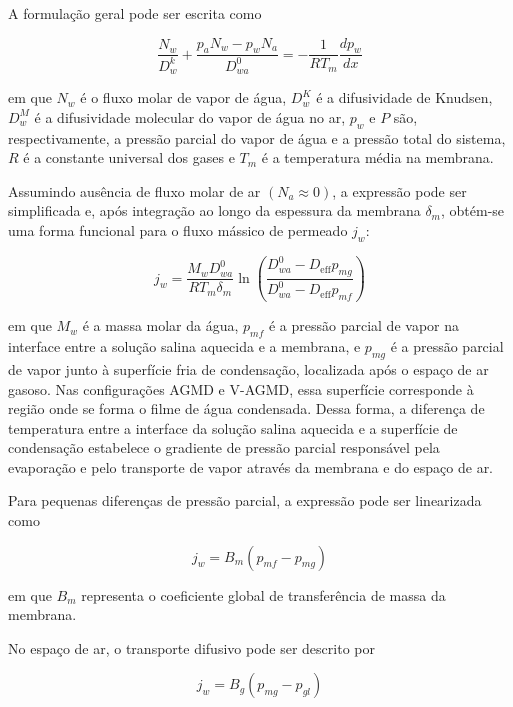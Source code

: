 A formulação geral pode ser escrita como

\begin{equation}
\frac{N_w}{D_w^k} + \frac{p_a N_w - p_w N_a}{D_{wa}^0}
=
-\frac{1}{R T_m}\frac{d p_w}{dx}
\end{equation}

\noindent em que \(N_w\) é o fluxo molar de vapor de água, \(D_w^{K}\) é a difusividade de Knudsen, \(D_w^{M}\) é a difusividade molecular do vapor de água no ar, \(p_w\) e \(P\) são, respectivamente, a pressão parcial do vapor de água e a pressão total do sistema, \(R\) é a constante universal dos gases e \(T_m\) é a temperatura média na membrana.

Assumindo ausência de fluxo molar de ar \((N_a \approx 0)\), a expressão pode ser simplificada e, após integração ao longo da espessura da membrana \(\delta_m\), obtém-se uma forma funcional para o fluxo mássico de permeado \(j_w\):

\begin{equation}
j_w = \frac{M_w D_{wa}^{0}}{R T_m \delta_m}
\ln \left(
\frac{D_{wa}^{0} - D_{\mathrm{eff}} p_{mg}}
{D_{wa}^{0} - D_{\mathrm{eff}} p_{mf}}
\right)
\end{equation}

\noindent em que \(M_w\) é a massa molar da água, \(p_{mf}\) é a pressão parcial de vapor na interface entre a solução salina aquecida e a membrana, e \(p_{mg}\) é a pressão parcial de vapor junto à superfície fria de condensação, localizada após o espaço de ar gasoso. Nas configurações AGMD e V-AGMD, essa superfície corresponde à região onde se forma o filme de água condensada. Dessa forma, a diferença de temperatura entre a interface da solução salina aquecida e a superfície de condensação estabelece o gradiente de pressão parcial responsável pela evaporação e pelo transporte de vapor através da membrana e do espaço de ar.

Para pequenas diferenças de pressão parcial, a expressão pode ser linearizada como

\begin{equation}
j_w = B_m (p_{mf} - p_{mg})
\end{equation}

em que $B_m$ representa o coeficiente global de transferência de massa da membrana.

No espaço de ar, o transporte difusivo pode ser descrito por

\begin{equation}
j_w = B_g (p_{mg} - p_{gl})
\end{equation}

